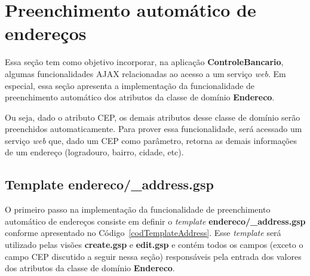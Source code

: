 \newpage

\section{Preenchimento automático de endereços}\label{secAutoFill}

\vspace{0.5cm}

Essa seção  tem como objetivo  incorporar, na aplicação  {\bf ControleBancario},
algumas funcionalidades AJAX  relacionadas ao acesso a um  serviço {\it web}. Em
especial,   essa  seção   apresenta   a  implementação   da  funcionalidade   de
preenchimento automático dos atributos da classe de domínio {\bf Endereco}. 

\vspace{0.2cm}

Ou seja, dado o atributo CEP,  os demais atributos desse classe de domínio serão
preenchidos automaticamente.  Para prover  essa funcionalidade, será acessado um
serviço {\it web} que, dado um CEP como parâmetro, retorna as demais informações
de um endereço (logradouro, bairro, cidade, etc).  

\subsection{Template endereco/\_address.gsp}

\vspace{0.5cm}

O primeiro passo na  implementação da funcionalidade de preenchimento automático
de endereços  consiste em definir o {\it  template} {\bf endereco/\_address.gsp}
conforme  apresentado no  Código~\ref{codTemplateAddress}.  Esse {\it  template}
será utilizado pelas visões {\bf create.gsp}  e {\bf edit.gsp} e contém todos os
campos (exceto  o campo  CEP discutido a  seguir nessa seção)  responsáveis pela
entrada dos valores dos atributos da classe de domínio {\bf Endereco}.  

